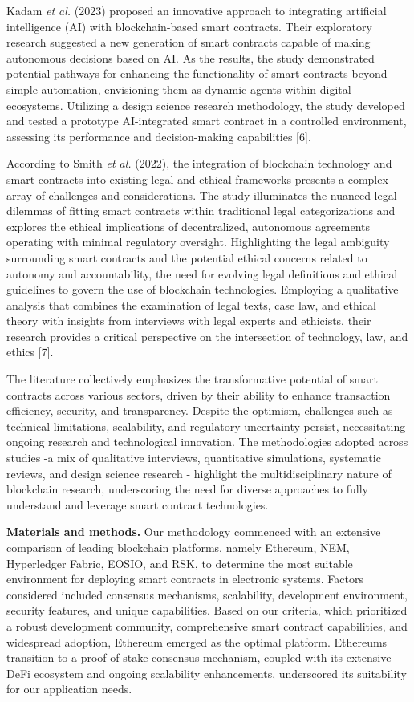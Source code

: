 Kadam \emph{et al.} (2023) proposed an innovative approach to
integrating artificial intelligence (AI) with blockchain-based smart
contracts. Their exploratory research suggested a new generation of
smart contracts capable of making autonomous decisions based on AI. As
the results, the study demonstrated potential pathways for enhancing the
functionality of smart contracts beyond simple automation, envisioning
them as dynamic agents within digital ecosystems. Utilizing a design
science research methodology, the study developed and tested a prototype
AI-integrated smart contract in a controlled environment, assessing its
performance and decision-making capabilities {[}6{]}.

According to Smith \emph{et al.} (2022), the integration of blockchain
technology and smart contracts into existing legal and ethical
frameworks presents a complex array of challenges and considerations.
The study illuminates the nuanced legal dilemmas of fitting smart
contracts within traditional legal categorizations and explores the
ethical implications of decentralized, autonomous agreements operating
with minimal regulatory oversight. Highlighting the legal ambiguity
surrounding smart contracts and the potential ethical concerns related
to autonomy and accountability, the need for evolving legal definitions
and ethical guidelines to govern the use of blockchain technologies.
Employing a qualitative analysis that combines the examination of legal
texts, case law, and ethical theory with insights from interviews with
legal experts and ethicists, their research provides a critical
perspective on the intersection of technology, law, and ethics {[}7{]}.

The literature collectively emphasizes the transformative potential of
smart contracts across various sectors, driven by their ability to
enhance transaction efficiency, security, and transparency. Despite the
optimism, challenges such as technical limitations, scalability, and
regulatory uncertainty persist, necessitating ongoing research and
technological innovation. The methodologies adopted across studies -a
mix of qualitative interviews, quantitative simulations, systematic
reviews, and design science research - highlight the multidisciplinary
nature of blockchain research, underscoring the need for diverse
approaches to fully understand and leverage smart contract technologies.

\textbf{Materials and methods.} Our methodology commenced with an
extensive comparison of leading blockchain platforms, namely Ethereum,
NEM, Hyperledger Fabric, EOSIO, and RSK, to determine the most suitable
environment for deploying smart contracts in electronic systems. Factors
considered included consensus mechanisms, scalability, development
environment, security features, and unique capabilities. Based on our
criteria, which prioritized a robust development community,
comprehensive smart contract capabilities, and widespread adoption,
Ethereum emerged as the optimal platform. Ethereum\textquotesingle s
transition to a proof-of-stake consensus mechanism, coupled with its
extensive DeFi ecosystem and ongoing scalability enhancements,
underscored its suitability for our application needs.

